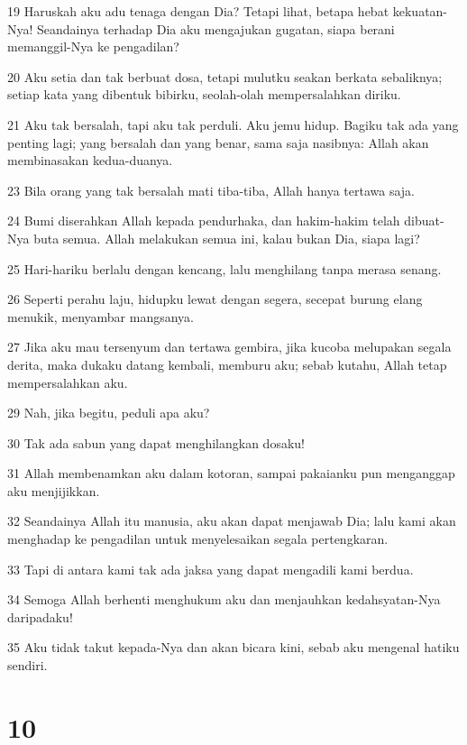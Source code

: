 \par 19 Haruskah aku adu tenaga dengan Dia? Tetapi lihat, betapa hebat kekuatan-Nya! Seandainya terhadap Dia aku mengajukan gugatan, siapa berani memanggil-Nya ke pengadilan?
\par 20 Aku setia dan tak berbuat dosa, tetapi mulutku seakan berkata sebaliknya; setiap kata yang dibentuk bibirku, seolah-olah mempersalahkan diriku.
\par 21 Aku tak bersalah, tapi aku tak perduli. Aku jemu hidup. Bagiku tak ada yang penting lagi; yang bersalah dan yang benar, sama saja nasibnya: Allah akan membinasakan kedua-duanya.
\par 23 Bila orang yang tak bersalah mati tiba-tiba, Allah hanya tertawa saja.
\par 24 Bumi diserahkan Allah kepada pendurhaka, dan hakim-hakim telah dibuat-Nya buta semua. Allah melakukan semua ini, kalau bukan Dia, siapa lagi?
\par 25 Hari-hariku berlalu dengan kencang, lalu menghilang tanpa merasa senang.
\par 26 Seperti perahu laju, hidupku lewat dengan segera, secepat burung elang menukik, menyambar mangsanya.
\par 27 Jika aku mau tersenyum dan tertawa gembira, jika kucoba melupakan segala derita, maka dukaku datang kembali, memburu aku; sebab kutahu, Allah tetap mempersalahkan aku.
\par 29 Nah, jika begitu, peduli apa aku?
\par 30 Tak ada sabun yang dapat menghilangkan dosaku!
\par 31 Allah membenamkan aku dalam kotoran, sampai pakaianku pun menganggap aku menjijikkan.
\par 32 Seandainya Allah itu manusia, aku akan dapat menjawab Dia; lalu kami akan menghadap ke pengadilan untuk menyelesaikan segala pertengkaran.
\par 33 Tapi di antara kami tak ada jaksa yang dapat mengadili kami berdua.
\par 34 Semoga Allah berhenti menghukum aku dan menjauhkan kedahsyatan-Nya daripadaku!
\par 35 Aku tidak takut kepada-Nya dan akan bicara kini, sebab aku mengenal hatiku sendiri.

\chapter{10}

